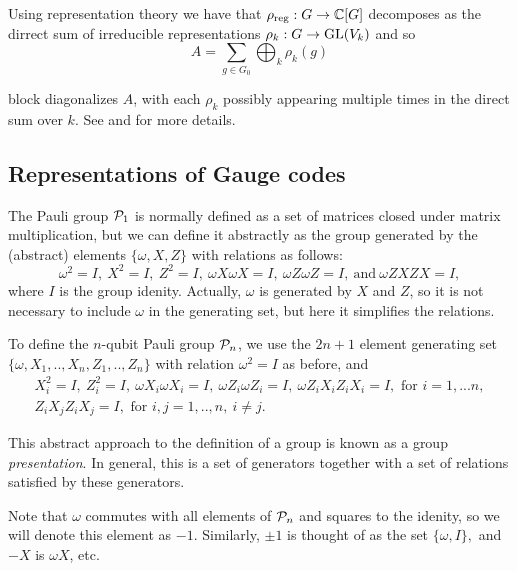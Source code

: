 \documentclass[12pt,notitlepage,longbibliography,nofootinbib,tightenlines]{revtex4}
\begin{document}
Using representation theory we have that 
$\rho_\mathrm{reg}:G\to \mathbb{C}[G]$
decomposes as the dirrect sum of irreducible
representations $\rho_k:G\to \mathrm{GL}(V_k)$
and so
$$
    A = \sum_{g\in G_0}\bigoplus_k \rho_k(g)
$$

block diagonalizes $A$,
with each $\rho_k$ possibly appearing multiple
times in the direct sum over $k$.
See \cite{Diaconis1981} and \cite{Kaski2002} for more details.

%
%

\subsection{Representations of Gauge codes}

The Pauli group $\mathcal{P}_1$ is normally 
defined as a set of matrices closed under
matrix multiplication, but we can define
it abstractly
as the group generated
by the (abstract) elements $\{\omega, X, Z\}$ with
relations as follows:
$$
\omega^2=I,\ X^2=I,\ Z^2=I,\ \omega X\omega X=I,\ \omega Z\omega Z=I,\ \mbox{and}\  \omega ZXZX=I,
$$
where $I$ is the group idenity.
Actually, $\omega $ is generated by $X$ and $Z$, so
it is not necessary to include $\omega $ in the generating set,
but here it simplifies the relations.

To define the $n$-qubit Pauli group $\mathcal{P}_n$, 
we use the $2n+1$ element 
generating set $\{\omega , X_1, .., X_n, Z_1, .., Z_n\}$
with relation $\omega^2=I$ as before, and
\begin{equation}\label{presentation}
\begin{array}{c}
X_i^2=I,\ Z_i^2=I,\ \omega X_i\omega X_i=I,\ \omega Z_i\omega Z_i=I,\ \omega Z_iX_iZ_iX_i=I, 
\mbox{\ for\ } i=1,...n,\\
Z_iX_jZ_iX_j=I, \mbox{\ for\ } i, j = 1,..,n,\ i\ne j.
\end{array}
\end{equation}

This abstract approach to the definition of a group is known as
a group {\it presentation}. In general, this is a set of
generators together with a set of relations satisfied
by these generators.

Note that $\omega$ commutes with all elements of $\mathcal{P}_n$
and squares to the idenity, so we will denote this
element as $-1.$ Similarly, $\pm 1$ is thought of as the
set $\{\omega, I\},$ and $-X$ is $\omega X$, etc.
\end{document}
